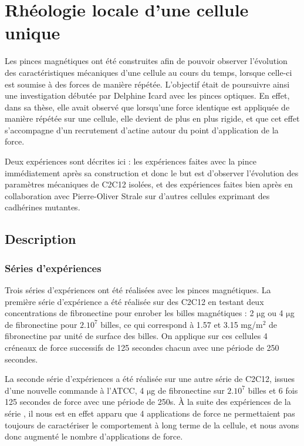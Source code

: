 \documentclass{report}
\newcommand{\micro}{$\mathrm{\mu}$}
\begin{document}
\chapter{Rhéologie locale d'une cellule unique}

Les pinces magnétiques ont été construites afin de pouvoir observer l'évolution des caractéristiques mécaniques d'une cellule au cours du temps, lorsque celle-ci est soumise à des forces de manière répétée. L'objectif était de poursuivre ainsi une investigation débutée par Delphine Icard avec les pinces optiques. En effet, dans sa thèse, elle avait observé que lorsqu'une force identique est appliquée de manière répétée sur une cellule, elle devient de plus en plus rigide, et que cet effet s'accompagne d'un recrutement d'actine autour du point d'application de la force. 

Deux expériences sont décrites ici : les expériences faites avec la pince immédiatement après sa construction et donc le but est d'observer l'évolution des paramètres mécaniques de C2C12 isolées, et des expériences faites bien après en collaboration avec Pierre-Oliver Strale sur d'autres cellules exprimant des cadhérines mutantes. 

\section{Description}

\subsection{Séries d'expériences}

Trois séries d'expériences ont été réalisées avec les pinces magnétiques.
La première série d'expérience a été réalisée sur des C2C12 en testant deux concentrations de fibronectine pour enrober les billes magnétiques : 2 \micro g ou  4 \micro g de fibronectine pour $2.10^7$ billes, ce qui correspond à 1.57 et 3.15 mg/m$^2$ de fibronectine par unité de surface des billes. 
On applique sur ces cellules 4 créneaux de force successifs de 125 secondes chacun avec une période de 250 secondes. 

La seconde série d'expériences a été réalisée sur une autre série de C2C12, issues d'une nouvelle commande à l'ATCC, 4 \micro g de fibronectine sur $2.10^7$ billes et 6 fois 125 secondes de force avec une période de 250s. 
À la suite des expériences de la série , il nous est en effet apparu que 4 applications de force ne permettaient pas toujours de caractériser le comportement à long terme de la cellule, et nous avons donc augmenté le nombre d'applications de force. 
\end{document}
